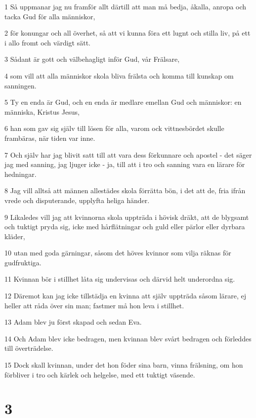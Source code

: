 \par 1 Så uppmanar jag nu framför allt därtill att man må bedja, åkalla, anropa och tacka Gud för alla människor,
\par 2 för konungar och all överhet, så att vi kunna föra ett lugnt och stilla liv, på ett i allo fromt och värdigt sätt.
\par 3 Sådant är gott och välbehagligt inför Gud, vår Frälsare,
\par 4 som vill att alla människor skola bliva frälsta och komma till kunskap om sanningen.
\par 5 Ty en enda är Gud, och en enda är medlare emellan Gud och människor: en människa, Kristus Jesus,
\par 6 han som gav sig själv till lösen för alla, varom ock vittnesbördet skulle frambäras, när tiden var inne.
\par 7 Och själv har jag blivit satt till att vara dess förkunnare och apostel - det säger jag med sanning, jag ljuger icke - ja, till att i tro och sanning vara en lärare för hedningar.
\par 8 Jag vill alltså att männen allestädes skola förrätta bön, i det att de, fria ifrån vrede och disputerande, upplyfta heliga händer.
\par 9 Likaledes vill jag att kvinnorna skola uppträda i hövisk dräkt, att de blygsamt och tuktigt pryda sig, icke med hårflätningar och guld eller pärlor eller dyrbara kläder,
\par 10 utan med goda gärningar, såsom det höves kvinnor som vilja räknas för gudfruktiga.
\par 11 Kvinnan bör i stillhet låta sig undervisas och därvid helt underordna sig.
\par 12 Däremot kan jag icke tillstädja en kvinna att själv uppträda såsom lärare, ej heller att råda över sin man; fastmer må hon leva i stillhet.
\par 13 Adam blev ju först skapad och sedan Eva.
\par 14 Och Adam blev icke bedragen, men kvinnan blev svårt bedragen och förleddes till överträdelse.
\par 15 Dock skall kvinnan, under det hon föder sina barn, vinna frälsning, om hon förbliver i tro och kärlek och helgelse, med ett tuktigt väsende.

\chapter{3}

